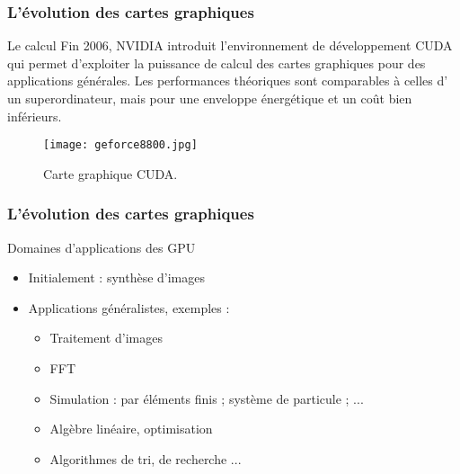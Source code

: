 \begin{frame}
  \frametitle{L'évolution des cartes graphiques}
\begin{block}{Le calcul}
    Fin 2006, NVIDIA introduit l'environnement de développement CUDA qui
    permet d'exploiter la puissance de calcul des cartes graphiques pour des applications générales.
    Les performances théoriques sont comparables à celles d' un 
    superordinateur, mais  pour une enveloppe énergétique et un coût bien inférieurs.

    \begin{figure}[htbp]
        \centering
       \texttt{[image: geforce8800.jpg]} 
        \caption{Carte graphique CUDA.}
        \label{fig:gforce8}
    \end{figure}
\end{block}
\end{frame}

\begin{frame}
  \frametitle{L'évolution des cartes graphiques}
\begin{block}{Domaines d'applications des GPU}
 \begin{itemize}
    \item Initialement : synthèse d'images
    \item Applications généralistes, exemples :
     \begin{itemize}
        \item Traitement d'images
        \item FFT
        \item Simulation : par éléments finis ; système de particule ; ...
        \item Algèbre linéaire, optimisation
        \item Algorithmes de tri, de recherche ...
    \end{itemize}
\end{itemize}   
\end{block}
\end{frame}

